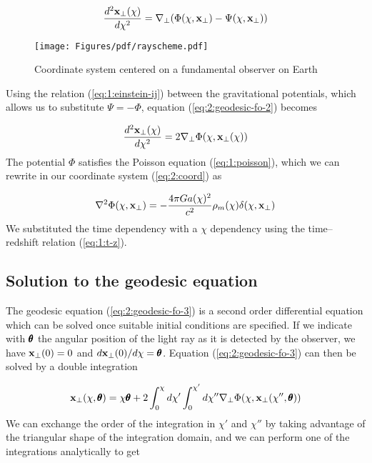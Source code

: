 \begin{equation}
\label{eq:2:geodesic-fo-2}
\frac{d^2\mathbf{x}_\perp(\chi)}{d\chi^2} = \nabla_\perp(\Phi(\chi,\mathbf{x}_\perp)-\Psi(\chi,\mathbf{x}_\perp))
\end{equation}
%
\begin{figure}
\begin{center}
\texttt{[image: Figures/pdf/rayscheme.pdf]}
\end{center}
\caption{Coordinate system centered on a fundamental observer on Earth}
\label{fig:2:scheme}
\end{figure}
%
Using the relation (\ref{eq:1:einstein-ij}) between the gravitational potentials, which allows us to substitute $\Psi=-\Phi$, equation (\ref{eq:2:geodesic-fo-2}) becomes 

\begin{equation}
\label{eq:2:geodesic-fo-3}
\frac{d^2\mathbf{x}_\perp(\chi)}{d\chi^2} = 2\nabla_\perp\Phi(\chi,\mathbf{x}_\perp(\chi))
\end{equation}
%
The potential $\Phi$ satisfies the Poisson equation (\ref{eq:1:poisson}), which we can rewrite in our coordinate system (\ref{eq:2:coord}) as

\begin{equation}
\label{eq:2:poisson}
\nabla^2\Phi(\chi,\mathbf{x}_\perp) = -\frac{4\pi Ga(\chi)^2}{c^2}\rho_m(\chi)\delta(\chi,\mathbf{x}_\perp)
\end{equation} 
%
We substituted the time dependency with a $\chi$ dependency using the time--redshift relation (\ref{eq:1:t-z}). 

\subsection{Solution to the geodesic equation}
The geodesic equation (\ref{eq:2:geodesic-fo-3}) is a second order differential equation which can be solved once suitable initial conditions are specified. If we indicate with $\pmb{\theta}$ the angular position of the light ray as it is detected by the observer, we have $\mathbf{x}_\perp(0)=0$ and $d\mathbf{x}_\perp(0) /d\chi=\pmb{\theta}$. Equation (\ref{eq:2:geodesic-fo-3}) can then be solved by a double integration

\begin{equation}
\label{eq:2:geosol-1}
\mathbf{x}_\perp(\chi,\pmb{\theta}) = \chi\pmb{\theta} + 2\int_0^\chi d\chi'\int_0^{\chi'}d\chi'' \nabla_\perp\Phi(\chi,\mathbf{x}_\perp(\chi'',\pmb{\theta}))
\end{equation} 
%
We can exchange the order of the integration in $\chi'$ and $\chi''$ by taking advantage of the triangular shape of the integration domain, and we can perform one of the integrations analytically to get


